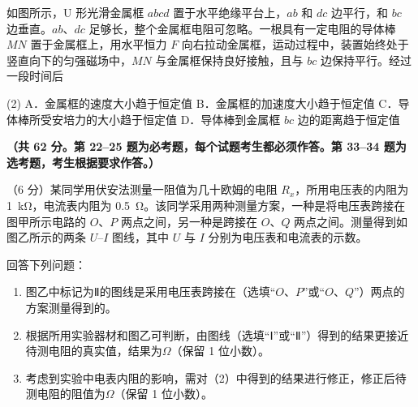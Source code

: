 \begin{question}
如图所示，U 形光滑金属框 $abcd$ 置于水平绝缘平台上，$ab$ 和 $dc$ 边平行，和 $bc$ 边垂直。$ab$、$dc$ 足够长，整个金属框电阻可忽略。一根具有一定电阻的导体棒 $MN$ 置于金属框上，用水平恒力 $F$ 向右拉动金属框，运动过程中，装置始终处于竖直向下的匀强磁场中，$MN$ 与金属框保持良好接触，且与 $bc$ 边保持平行。经过一段时间后\gkblank


\begin{gkopts}(2)
  \task A．金属框的速度大小趋于恒定值
  \task B．金属框的加速度大小趋于恒定值
  \task C．导体棒所受安培力的大小趋于恒定值
  \task D．导体棒到金属框 $bc$ 边的距离趋于恒定值
\end{gkopts}
\end{question}


\textbf{（共 62 分。第 22--25 题为必考题，每个试题考生都必须作答。第 33--34 题为选考题，考生根据要求作答。）}


\begin{question}
（6 分）某同学用伏安法测量一阻值为几十欧姆的电阻 $R_x$，所用电压表的内阻为 \SI{1}{\kilo\ohm}，电流表内阻为 \SI{0.5}{\ohm}。该同学采用两种测量方案，一种是将电压表跨接在图甲所示电路的 $O$、$P$ 两点之间，另一种是跨接在 $O$、$Q$ 两点之间。测量得到如图乙所示的两条 $U$--$I$ 图线，其中 $U$ 与 $I$ 分别为电压表和电流表的示数。



回答下列问题：
\begin{enumerate}[leftmargin=2em, label=(\arabic*)]
  \item 图乙中标记为Ⅱ的图线是采用电压表跨接在\gkblank（选填“$O$、$P$”或“$O$、$Q$”）两点的方案测量得到的。
  \item 根据所用实验器材和图乙可判断，由图线\gkblank（选填“Ⅰ”或“Ⅱ”）得到的结果更接近待测电阻的真实值，结果为\gkblank $\Omega$（保留 1 位小数）。
  \item 考虑到实验中电表内阻的影响，需对（2）中得到的结果进行修正，修正后待测电阻的阻值为\gkblank $\Omega$（保留 1 位小数）。
\end{enumerate}
\end{question}

